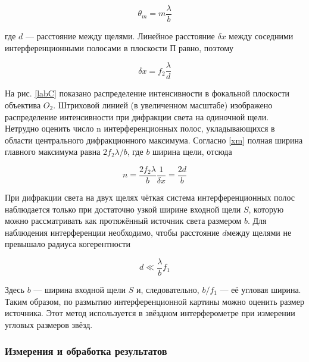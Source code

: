 \documentclass[a4paper, 12pt]{article}%
\begin{document}
 	\begin{equation}\label{}
 		\theta_m = m \dfrac{\lambda}{b}
 	\end{equation}
 	
 	где $ d $ --- расстояние между щелями. Линейное расстояние $ \delta x $ между соседними интерференционными полосами в плоскости П равно, поэтому
 	
 	\begin{equation}\label{dx}
 		\delta x = f_2 \dfrac{\lambda}{d}
 	\end{equation}
 	
 	На рис. \ref{labC} показано распределение интенсивности в фокальной плоскости объектива $ O_2 $. Штриховой линией (в увеличенном масштабе)
 	изображено распределение интенсивности при дифракции света на одиночной щели. Нетрудно оценить число n интерференционных полос,
 	укладывающихся в области центрального дифракционного максимума.
 	Согласно \eqref{xm} полная ширина главного максимума равна $ 2 f_2 \lambda /b $, где $ b $ ширина щели, отсюда
 	
 	\begin{equation}\label{n}
 		n = \dfrac{2f_2 \lambda}{b} \dfrac{1}{\delta x} = \dfrac{2d}{b}
 	\end{equation}
 	
 	При дифракции света на двух щелях чёткая система интерференционных полос наблюдается только при достаточно узкой ширине входной щели $ S $, которую можно рассматривать как протяжённый источник света размером $ b $. Для наблюдения интерференции необходимо, чтобы расстояние $ d $между щелями не превышало радиуса когерентности
 	
 	\begin{equation}\label{}
 		d \ll \dfrac{\lambda}{b} f_1
 	\end{equation}
 	
 	Здесь $ b $ --- ширина входной щели $ S $ и, следовательно, $  b/f_1 $ --- её угловая ширина. Таким образом, по размытию интерференционной картины можно оценить размер источника. Этот метод используется в звёздном интерферометре при измерении угловых размеров звёзд.
 	
 	\subsubsection{Измерения и обработка результатов}
 	
\end{document}
